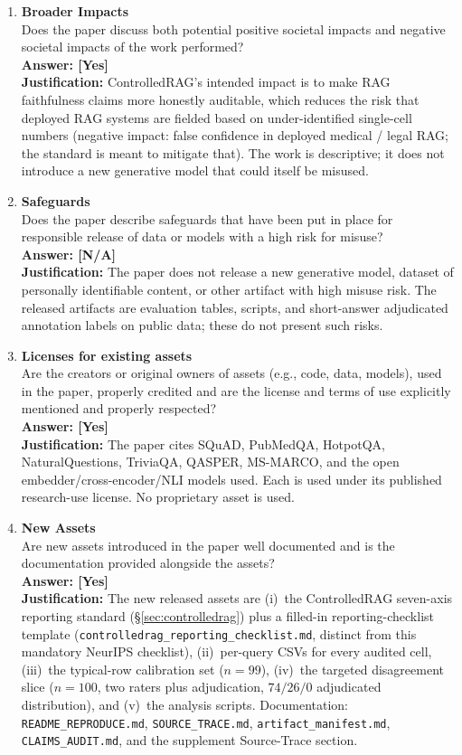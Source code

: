 \begin{enumerate}
\item {\bf Broader Impacts}\\
Does the paper discuss both potential positive societal impacts and
negative societal impacts of the work performed?
\\\textbf{Answer: [Yes]}
\\\textbf{Justification:} ControlledRAG's intended impact is to make
RAG faithfulness claims more honestly auditable, which reduces the
risk that deployed RAG systems are fielded based on under-identified
single-cell numbers (negative impact: false confidence in deployed
medical / legal RAG; the standard is meant to mitigate that). The
work is descriptive; it does not introduce a new generative model
that could itself be misused.

\item {\bf Safeguards}\\
Does the paper describe safeguards that have been put in place for
responsible release of data or models with a high risk for misuse?
\\\textbf{Answer: [N/A]}
\\\textbf{Justification:} The paper does not release a new generative
model, dataset of personally identifiable content, or other artifact
with high misuse risk. The released artifacts are evaluation tables,
scripts, and short-answer adjudicated annotation labels on public
data; these do not present such risks.

\item {\bf Licenses for existing assets}\\
Are the creators or original owners of assets (e.g., code, data,
models), used in the paper, properly credited and are the license and
terms of use explicitly mentioned and properly respected?
\\\textbf{Answer: [Yes]}
\\\textbf{Justification:} The paper cites SQuAD, PubMedQA, HotpotQA,
NaturalQuestions, TriviaQA, QASPER, MS-MARCO, and the open
embedder/cross-encoder/NLI models used. Each is used under its
published research-use license. No proprietary asset is used.

\item {\bf New Assets}\\
Are new assets introduced in the paper well documented and is the
documentation provided alongside the assets?
\\\textbf{Answer: [Yes]}
\\\textbf{Justification:} The new released assets are
(i)~the ControlledRAG seven-axis reporting standard
(\S\ref{sec:controlledrag}) plus a filled-in reporting-checklist
template
(\texttt{controlledrag\_reporting\_checklist.md},
distinct from this mandatory NeurIPS checklist),
(ii)~per-query CSVs for every audited cell,
(iii)~the typical-row calibration set ($n{=}99$),
(iv)~the targeted disagreement slice ($n{=}100$, two raters plus
adjudication, $74/26/0$ adjudicated distribution),
and (v)~the analysis scripts. Documentation:
\texttt{README\_REPRODUCE.md},
\texttt{SOURCE\_TRACE.md},
\texttt{artifact\_manifest.md},
\texttt{CLAIMS\_AUDIT.md},
and the supplement Source-Trace section.


\end{enumerate}
